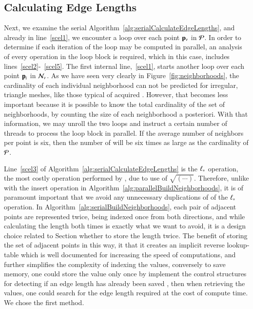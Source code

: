 \subsection{Calculating Edge Lengths}
\label{ch5sPAssCEL}
Next, we examine the serial Algorithm~\ref{alg:serialCalculateEdgeLengths}, and already in line~\ref{scel1}, we encounter a loop over each point $\mathbf{p}_v$ in $\mathcal{P}$. In order to determine if each iteration of the loop may be computed in parallel, an analysis of every operation in the loop block is required, which in this case, includes lines~\ref{scel2}-~\ref{scel5}. The first internal line,~\ref{scel1}, starts another loop over each point $\mathbf{p}_i$ in $\mathcal{N}_v$.  As we have seen very clearly in Figure~\ref{fig:neighborhoods}, the cardinality of each individual neighborhood can not be predicted for irregular, triangle meshes, like those typical of acquired \tdd{}. However, that becomes less important because it is possible to know the total cardinality of the set of neighborhoods, by counting the size of each neighborhood a posteriori. With that information, we may unroll the two loops and instruct a certain number of threads to process the loop block in parallel. If the average number of neighbors per point is six, then the number of will be six times as large as the cardinality of $\mathcal{P}$.

Line~\ref{scel3} of Algorithm~\ref{alg:serialCalculateEdgeLengths} is the $\ell_\ast$ operation, the most costly operation performed by , due to use of $\sqrt{(\cdots)}$. Therefore, unlike with the insert operation in Algorithm~\ref{alg:parallelBuildNeighborhoods}, it is of paramount important that we avoid any unnecessary duplications of of the $\ell_\ast$ operation. In Algorithm~\ref{alg:serialBuildNeighborhoods}, each pair of adjacent points are represented twice, being indexed once from both directions, and while calculating the length both times is exactly what we want to avoid, it is a design choice related to Section whether to store the length twice. The benefit of storing the set of adjacent points in this way, it that it creates an implicit reverse lookup-table which is well documented for increasing the speed of computations, and further simplifies the complexity of indexing the values, conversely to save memory, one could store the value only once by implement the control structures for detecting if an edge length has already been saved , then when retrieving the values, one could search for the edge length required at the cost of compute time. We chose the first method.

